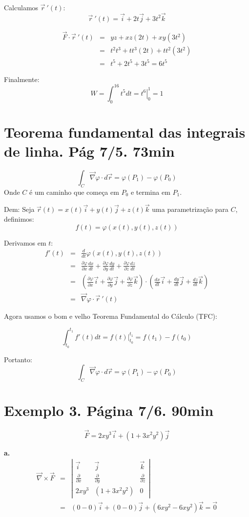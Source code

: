 \documentclass[a4paper,10pt]{book}
\begin{document}
Calculamos $\vec{r}\!~'(t)$:
$$\vec{r}\!~'(t)=\vec{i}+2t\vec{j}+3t^2\vec{k}$$

\begin{eqnarray*}
 \vec{F}\cdot \vec{r}\!~'(t)&=&yz+xz(2t)+xy(3t^2)\\
 &=&t^2t^3+tt^3(2t)+tt^2(3t^2)\\
 &=&t^5+2t^5+3t^5 = 6t^5
\end{eqnarray*}

Finalmente:
$$W=\int_0^16t^5dt = \left.t^6\right|_0^1=1$$

\section{Teorema fundamental das integrais de linha. Pág 7/5. 73min}
$$\int_C \vec{\nabla}\varphi \cdot d\vec{r}=\varphi(P_1)-\varphi(P_0)$$
Onde $C$ é um caminho que começa em $P_0$ e termina em $P_1$.

Dem: Seja $\vec{r}(t)=x(t)\vec{i}+y(t)\vec{j}+z(t)\vec{k}$ uma parametrização para $C$, definimos:
$$f(t)=\varphi(x(t),y(t),z(t))$$

Derivamos em $t$:
\begin{eqnarray*}
 f'(t)&=&\frac{d}{dt}\varphi(x(t),y(t),z(t))\\
 &=&\frac{\partial \varphi}{\partial x}\frac{dx}{dt}+\frac{\partial \varphi}{\partial y}\frac{dy}{dt}+\frac{\partial \varphi}{\partial z}\frac{dz}{dt}
 \\&=&\left(\frac{\partial \varphi}{\partial x}\vec{i}+\frac{\partial \varphi}{\partial y}\vec{j}+\frac{\partial \varphi}{\partial z}\vec{k}\right)\cdot\left(\frac{dx}{d t}\vec{i}+\frac{dy}{d t}\vec{j}+\frac{dz}{d t}\vec{k}\right)\\
 &=&\vec{\nabla}\varphi\cdot \vec{r}\!~'(t)
\end{eqnarray*}

Agora usamos o bom e velho Teorema Fundamental do Cálculo (TFC):

$$\int_{t_0}^{t_1}f'(t)dt=\left. f(t) \right|_{t_0}^{t_1} =f(t_1)-f(t_0)$$

Portanto:
$$\int_C \vec{\nabla}\varphi \cdot d\vec{r}=\varphi(P_1)-\varphi(P_0)$$

\section{Exemplo 3. Página 7/6. 90min}

$$\vec{F}=2xy^3\vec{i}+(1+3x^2y^2)\vec{j}$$

{\bf a.}
\begin{eqnarray*}
\vec{\nabla}\times \vec{F}&=&\left|
\begin{array}{ccc}
\vec{i}& \vec{j}&\vec{k}\\[.4cm]
\frac{\partial}{\partial x} & \frac{\partial}{\partial y} &\frac{\partial}{\partial z} \\[.4cm]
2xy^3&(1+3x^2y^2)&0
\end{array}
\right|\\
&=&\left(0-0\right)\vec{i}+\left(0-0\right)\vec{j}+\left(6xy^2-6xy^2\right)\vec{k}=\vec{0}
\end{eqnarray*}
\end{document}
